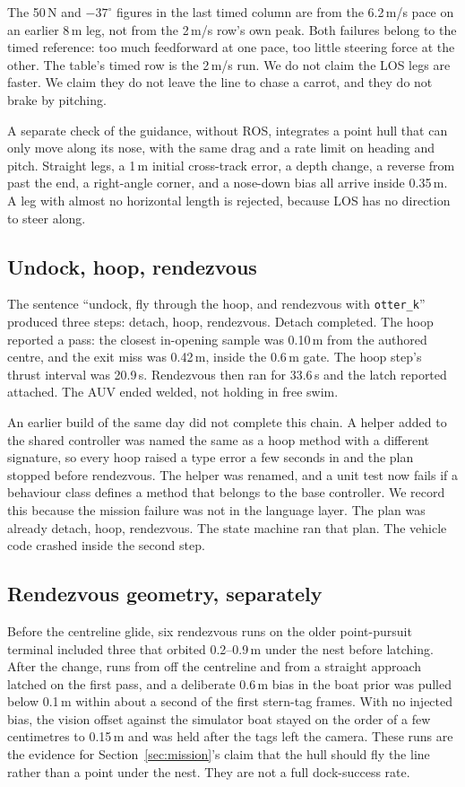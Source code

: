 \documentclass[conference]{IEEEtran}
\def\otterk{\texttt{otter\_k}}
\begin{document}
The 50\,N and $-37^\circ$ figures in the last timed column are from the 6.2\,m/s pace on an earlier 8\,m leg, not from the 2\,m/s row's own peak. Both failures belong to the timed reference: too much feedforward at one pace, too little steering force at the other. The table's timed row is the 2\,m/s run. We do not claim the LOS legs are faster. We claim they do not leave the line to chase a carrot, and they do not brake by pitching.

A separate check of the guidance, without ROS, integrates a point hull that can only move along its nose, with the same drag and a rate limit on heading and pitch. Straight legs, a 1\,m initial cross-track error, a depth change, a reverse from past the end, a right-angle corner, and a nose-down bias all arrive inside 0.35\,m. A leg with almost no horizontal length is rejected, because LOS has no direction to steer along.

\subsection{Undock, hoop, rendezvous}
The sentence ``undock, fly through the hoop, and rendezvous with \otterk{}'' produced three steps: detach, hoop, rendezvous. Detach completed. The hoop reported a pass: the closest in-opening sample was 0.10\,m from the authored centre, and the exit miss was 0.42\,m, inside the 0.6\,m gate. The hoop step's thrust interval was 20.9\,s. Rendezvous then ran for 33.6\,s and the latch reported attached. The AUV ended welded, not holding in free swim.

An earlier build of the same day did not complete this chain. A helper added to the shared controller was named the same as a hoop method with a different signature, so every hoop raised a type error a few seconds in and the plan stopped before rendezvous. The helper was renamed, and a unit test now fails if a behaviour class defines a method that belongs to the base controller. We record this because the mission failure was not in the language layer. The plan was already detach, hoop, rendezvous. The state machine ran that plan. The vehicle code crashed inside the second step.

\subsection{Rendezvous geometry, separately}
Before the centreline glide, six rendezvous runs on the older point-pursuit terminal included three that orbited 0.2--0.9\,m under the nest before latching. After the change, runs from off the centreline and from a straight approach latched on the first pass, and a deliberate 0.6\,m bias in the boat prior was pulled below 0.1\,m within about a second of the first stern-tag frames. With no injected bias, the vision offset against the simulator boat stayed on the order of a few centimetres to 0.15\,m and was held after the tags left the camera. These runs are the evidence for Section~\ref{sec:mission}'s claim that the hull should fly the line rather than a point under the nest. They are not a full dock-success rate.
\end{document}
